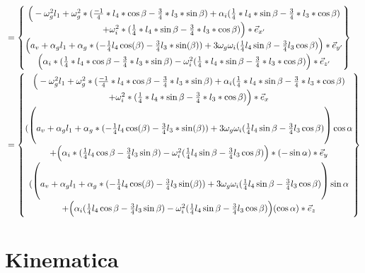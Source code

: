 \documentclass[a4paper,10pt]{article}
\begin{document}
\begin{equation}
\begin{aligned}
&=\begin{Bmatrix}
\Big( -\omega^{2}_g l_1 +\omega_{g}^{2} * (\frac{-1}{4}*l_4*\cos{\beta}-\frac{3}{4}*l_3*\sin{\beta})+\alpha_i(\frac{1}{4}*l_4 *\sin{\beta}-\frac{3}{4}*l_3 * \cos{\beta})\\ + \omega_i^2*(\frac{1}{4}*l_4 *\sin{\beta}-\frac{3}{4}*l_3 * \cos{\beta}) \Big)* \vec{e}_{x'}\\
\Big(a_v +\alpha_g l_1 +\alpha_g *({-\frac{1}{4}}  l_4 \cos(\beta)-\frac{3}{4}l_3*\sin(\beta)) + 3\omega_g\omega_i(\frac{1}{4}l_4 \sin{\beta}-\frac{3}{4}l_3  \cos{\beta})\Big)*\vec{e}_{y'}\\
\Big(\alpha_i * (\frac{1}{4}*l_4*\cos{\beta} - \frac{3}{4}*l_3 * \sin{\beta}) - \omega_i^2(\frac{1}{4}*l_4 *\sin{\beta}-\frac{3}{4}*l_3 * \cos{\beta})\Big)*\vec{e}_{z'}
\end{Bmatrix}\\
&= \begin{Bmatrix}
\Big( -\omega^{2}_g l_1 +\omega_{g}^{2} * (\frac{-1}{4}*l_4*\cos{\beta}-\frac{3}{4}*l_3*\sin{\beta})+\alpha_i(\frac{1}{4}*l_4 *\sin{\beta}-\frac{3}{4}*l_3 * \cos{\beta})\\ + \omega_i^2*(\frac{1}{4}*l_4 *\sin{\beta}-\frac{3}{4}*l_3 * \cos{\beta}) \Big)* \vec{e}_{x}\\
\Huge(\Big(a_v +\alpha_g l_1 +\alpha_g *({-\frac{1}{4}}  l_4 \cos(\beta)-\frac{3}{4}l_3*\sin(\beta)) + 3\omega_g\omega_i(\frac{1}{4}l_4 \sin{\beta}-\frac{3}{4}l_3  \cos{\beta})\Big)\cos{\alpha}\\ + \Big(\alpha_i * (\frac{1}{4} l_4 \cos{\beta} - \frac{3}{4} l_3 \sin{\beta}) - \omega_i^2(\frac{1}{4} l_4 \sin{\beta}-\frac{3}{4} l_3  \cos{\beta})\Big)*(-\sin{\alpha}\Huge)*\vec{e}_{y}\\
\Huge(\Big(a_v +\alpha_g l_1 +\alpha_g *({-\frac{1}{4}}  l_4 \cos(\beta)-\frac{3}{4}l_3 \sin(\beta)) + 3\omega_g\omega_i(\frac{1}{4}l_4 \sin{\beta}-\frac{3}{4}l_3  \cos{\beta})\Big)\sin{\alpha}\\ + \Big(\alpha_i (\frac{1}{4} l_4 \cos{\beta} - \frac{3}{4} l_3 \sin{\beta}) - \omega_i^2(\frac{1}{4} l_4 \sin{\beta}-\frac{3}{4} l_3   \cos{\beta})\Big) (\cos{\alpha}\Huge)*\vec{e}_{z}
\end{Bmatrix}
\end{aligned}
\end{equation}
\section{Kinematica}
\end{document}
